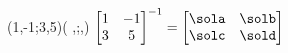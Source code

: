 \INVERSEMATRIX(1,-1;3,5)(%
            \sola,\solb;\solc,\sold)
$\begin{bmatrix}
       1 & -1 \\ 3 & 5
 \end{bmatrix}^{-1}=
 \begin{bmatrix}
       \sola & \solb \\ \solc & \sold
 \end{bmatrix}$
